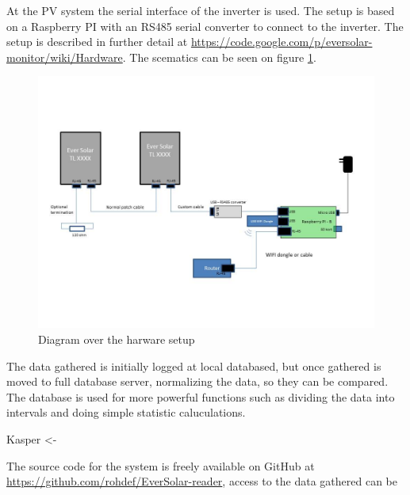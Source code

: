 At the PV system the serial interface of the inverter is used.  The
setup is based on a Raspberry PI with an RS485 serial converter to
connect to the inverter.  The setup is described in further detail at
\url{https://code.google.com/p/eversolar-monitor/wiki/Hardware}.  The
scematics can be seen on figure \ref{fig:hardware}.

\begin{figure}[h]
  \centering
  \includegraphics{hardware.jpg}
  \caption{Diagram over the harware setup}
  \label{fig:hardware}
\end{figure}

The data gathered is initially logged at local databased, but once
gathered is moved to full database server, normalizing the data, so
they can be compared.  The database is used for more powerful
functions such as dividing the data into intervals and doing simple
statistic caluculations.

Kasper <-

The source code for the system is freely available on GitHub at
\url{https://github.com/rohdef/EverSolar-reader}, access to the data
gathered can be


